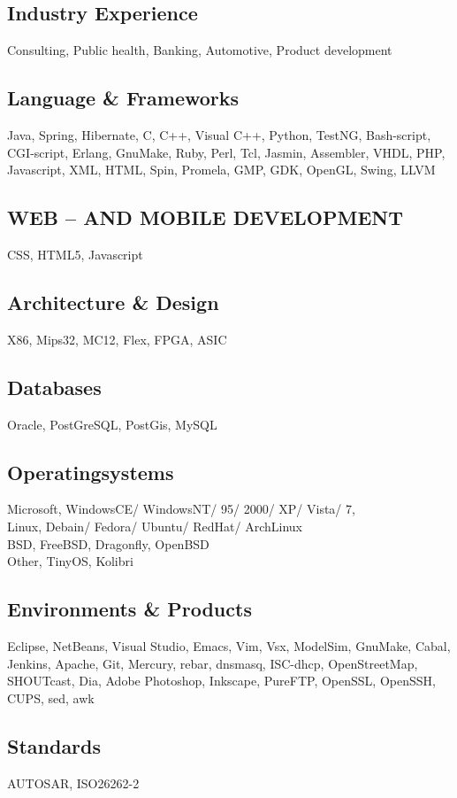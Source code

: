\documentclass[fontsize=10pt]{tccv}
\begin{document}
\subsection{Industry Experience}
Consulting,
Public health,
Banking,
Automotive,
Product development

\subsection{Language \& Frameworks}
Java, Spring, Hibernate, C, C++, Visual C++, Python, TestNG, Bash-script, CGI-script, Erlang, GnuMake, Ruby, Perl, Tcl, Jasmin, Assembler, VHDL, PHP, Javascript, XML, HTML, Spin, Promela, GMP, GDK, OpenGL, Swing, LLVM
\subsection{WEB – AND MOBILE DEVELOPMENT}
        CSS, HTML5, Javascript


\subsection{Architecture \& Design}
X86, Mips32, MC12, Flex, FPGA, ASIC

\subsection{Databases}
Oracle, PostGreSQL, PostGis, MySQL

\subsection{Operatingsystems}
Microsoft, WindowsCE/ WindowsNT/ 95/ 2000/ XP/ Vista/ 7,
\\
Linux, Debain/ Fedora/ Ubuntu/ RedHat/ ArchLinux
\\
BSD, FreeBSD, Dragonfly, OpenBSD
\\
Other, TinyOS, Kolibri

\subsection{Environments \& Products}
Eclipse, NetBeans, Visual Studio, Emacs, Vim, Vsx, ModelSim, GnuMake, Cabal,
Jenkins, Apache, Git, Mercury, rebar, dnsmasq, ISC-dhcp, OpenStreetMap,
SHOUTcast, Dia, Adobe Photoshop, Inkscape, PureFTP, OpenSSL, OpenSSH, CUPS,
sed, awk

\subsection{Standards}
AUTOSAR, ISO26262-2
\end{document}

